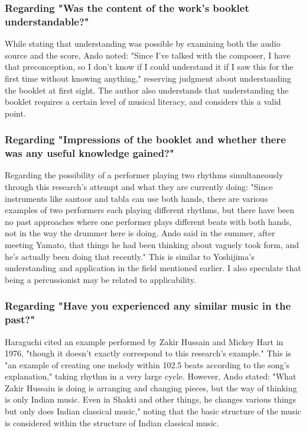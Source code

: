 \subsubsection{Regarding "Was the content of the work's booklet understandable?"}

While stating that understanding was possible by examining both the audio source and the score, Ando noted: "Since I've talked with the composer, I have that preconception, so I don't know if I could understand it if I saw this for the first time without knowing anything," reserving judgment about understanding the booklet at first sight. The author also understands that understanding the booklet requires a certain level of musical literacy, and considers this a valid point.

\subsubsection{Regarding "Impressions of the booklet and whether there was any useful knowledge gained?"}

Regarding the possibility of a performer playing two rhythms simultaneously through this research's attempt and what they are currently doing: "Since instruments like santoor and tabla can use both hands, there are various examples of two performers each playing different rhythms, but there have been no past approaches where one performer plays different beats with both hands, not in the way the drummer here is doing. Ando said in the summer, after meeting Yamato, that things he had been thinking about vaguely took form, and he's actually been doing that recently." This is similar to Yoshijima's understanding and application in the field mentioned earlier. I also speculate that being a percussionist may be related to applicability.

\subsubsection{Regarding "Have you experienced any similar music in the past?"}

Haraguchi cited an example performed by Zakir Hussain and Mickey Hart in 1976, "though it doesn't exactly correspond to this research's example." This is "an example of creating one melody within 102.5 beats according to the song's explanation," taking rhythm in a very large cycle. However, Ando stated: "What Zakir Hussain is doing is arranging and changing pieces, but the way of thinking is only Indian music. Even in Shakti and other things, he changes various things but only does Indian classical music," noting that the basic structure of the music is considered within the structure of Indian classical music.

